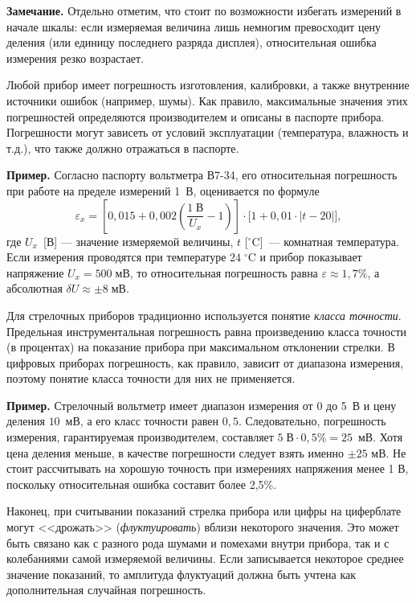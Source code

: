 \documentclass[10pt]{article}
\begin{document}
{\footnotesize
\textbf{Замечание.} Отдельно отметим, что стоит по
возможности избегать измерений в начале шкалы: если измеряемая величина
лишь немногим превосходит цену деления (или единицу последнего разряда
дисплея), относительная ошибка измерения резко возрастает.\par
}%


Любой прибор имеет погрешность изготовления, калибровки, а также внутренние
источники ошибок (например, шумы). Как правило, максимальные значения
этих погрешностей определяются производителем и описаны в паспорте
прибора. Погрешности могут зависеть от условий эксплуатации (температура,
влажность и т.д.), что также должно отражаться в паспорте. 

{\footnotesize
\textbf{Пример.} Согласно паспорту
вольтметра В7-34, его относительная погрешность при работе на пределе
измерений 1~В, оценивается по формуле 
\[
\varepsilon_{x}=\left[0{,}015+0{,}002\left(\frac{1\;\text{В}}{U_{x}}-1\right)\right]\cdot\bigr[1+0{,}01\cdot|t-20|\bigl],
\]
где $U_{x}$~{[}В{]} --- значение измеряемой величины,
$t$ {[}$^{\circ}\mathrm{C}${]}~--- комнатная температура.
Если измерения проводятся при температуре $24\;^{\circ}\mathrm{C}$
и прибор показывает напряжение $U_{x}=500\;\text{мВ}$, то относительная
погрешность равна $\varepsilon\approx1{,}7\%$, а абсолютная $\delta U\approx\pm8\;\text{мВ}.$\par
}%

Для стрелочных приборов традиционно используется понятие \emph{класса
точности}. Предельная инструментальная погрешность равна произведению
класса точности (в процентах) на показание прибора при максимальном
отклонении стрелки. В цифровых приборах погрешность, как правило,
зависит от диапазона измерения, поэтому понятие класса точности для
них не применяется.

{\footnotesize
\textbf{Пример.} Стрелочный вольтметр
имеет диапазон измерения от 0 до 5~В и цену деления $10$~мВ, а
его класс точности равен $0{,}5$. Следовательно, погрешность измерения,
гарантируемая производителем, составляет $5\;\text{В}\cdot0{,}5\%=25$~мВ.
Хотя цена деления меньше, в качестве погрешности следует взять именно
$\pm25$ мВ. Не стоит рассчитывать на хорошую точность при измерениях
напряжения менее 1 В, поскольку относительная ошибка составит более
2,5\%.\par
}%

Наконец, при считывании показаний стрелка прибора или цифры на циферблате
могут <<дрожать>> (\emph{флуктуировать})
вблизи некоторого значения. Это может быть связано как с разного рода
шумами и помехами внутри прибора, так и с колебаниями самой измеряемой
величины. Если записывается некоторое среднее значение показаний,
то амплитуда флуктуаций должна быть учтена как дополнительная случайная
погрешность.
\end{document}
